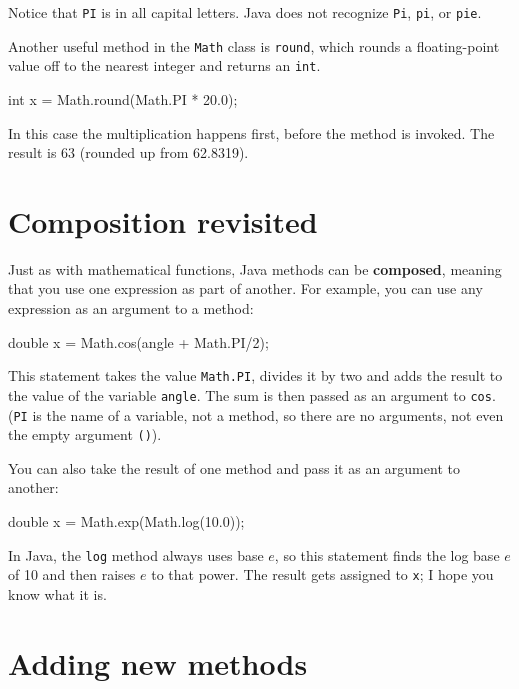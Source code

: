 Notice that {\tt PI} is in all capital letters.
Java does not recognize {\tt Pi}, {\tt pi}, or {\tt pie}.

Another useful method in the {\tt Math} class is {\tt round}, which rounds a floating-point value off to the nearest integer and returns an {\tt int}.

\begin{code}
    int x = Math.round(Math.PI * 20.0);
\end{code}

In this case the multiplication happens first, before the method is invoked.
The result is 63 (rounded up from 62.8319).


\section{Composition revisited}
\label{composition}


Just as with mathematical functions, Java methods can be {\bf composed}, meaning that you use one expression as part of another.
For example, you can use any expression as an argument to a method:

\begin{code}
    double x = Math.cos(angle + Math.PI/2);
\end{code}

This statement takes the value {\tt Math.PI}, divides it by two and adds the result to the value of the variable {\tt angle}.
The sum is then passed as an argument to {\tt cos}.
({\tt PI} is the name of a variable, not a method, so there are no arguments, not even the empty argument {\tt()}).

You can also take the result of one method and pass it as an argument to another:

\begin{code}
    double x = Math.exp(Math.log(10.0));
\end{code}

In Java, the {\tt log} method always uses base $e$, so this statement finds the log base $e$ of 10 and then raises $e$ to that power.
The result gets assigned to {\tt x}; I hope you know what it is.

\section{Adding new methods}
\label{adding_methods}


